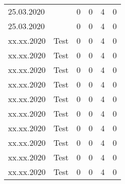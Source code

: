 \begin{landscape}
\begin{longtable}[c]{lp{10cm}rrrr}
	25.03.2020 
	& 
	& 0 %
	& 0 %
	& 4 %
	& 0\\ %

	25.03.2020 
	& 
	& 0 %
	& 0 %
	& 4 %
	& 0\\ %
	
	
	xx.xx.2020 
	& Test
	& 0 %
	& 0 %
	& 4 %
	& 0\\ %
	
	xx.xx.2020 
	& Test
	& 0 %
	& 0 %
	& 4 %
	& 0\\ %

	xx.xx.2020 
	& Test
	& 0 %
	& 0 %
	& 4 %
	& 0\\ %

	xx.xx.2020 
	& Test
	& 0 %
	& 0 %
	& 4 %
	& 0\\ %

	xx.xx.2020 
	& Test
	& 0 %
	& 0 %
	& 4 %
	& 0\\ %

	xx.xx.2020 
	& Test
	& 0 %
	& 0 %
	& 4 %
	& 0\\ %
	
	xx.xx.2020 
	& Test
	& 0 %
	& 0 %
	& 4 %
	& 0\\ %

	xx.xx.2020 
	& Test
	& 0 %
	& 0 %
	& 4 %
	& 0\\ %

	xx.xx.2020 
	& Test
	& 0 %
	& 0 %
	& 4 %
	& 0\\ %

	xx.xx.2020 
	& Test
	& 0 %
	& 0 %
	& 4 %
	& 0\\ %
	
\end{longtable}


\end{landscape}

